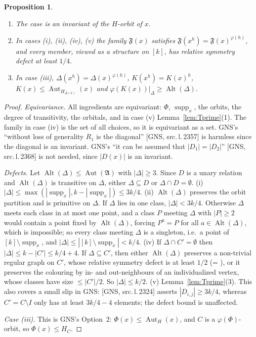 \documentclass[11pt]{article}
\theoremstyle{plain}
\newtheorem{proposition}[theorem]{Proposition}
\theoremstyle{definition}
\theoremstyle{remark}
\theoremstyle{named}
\theoremstyle{namedrm}
\newcommand{\Alt}{\operatorname{Alt}}
\newcommand{\Aut}{\operatorname{Aut}}
\newcommand{\supp}{\operatorname{supp}}
\newcommand{\fA}{\mathfrak{A}}
\newcommand{\fF}{\mathfrak{F}}
\newcommand{\src}[2]{[#1, src.\,l.\,#2]}
\begin{document}
\begin{proposition}\label{prop:cases}
\begin{enumerate}
\item The case is an invariant of the $H$-orbit of $x$.
\item In cases (i), (ii), (iv), (v) the family $\fF(x)$ satisfies $\fF(x^h)=\fF(x)^{\varphi(h)}$, and every
  member, viewed as a structure on $[k]$, has relative symmetry defect at least $1/4$.
\item In case (iii), $\Delta(x^h)=\Delta(x)^{\varphi(h)}$, $K(x^h)=K(x)^h$, $K(x)\le\Aut_{H_{\Delta(x)}}(x)$ and
  $\varphi(K(x))|_{\Delta}\ge\Alt(\Delta)$.
\end{enumerate}
\end{proposition}
\begin{proof}
\emph{Equivariance.} All ingredients are equivariant: $\Phi$, $\supp_x$, the orbits, the degree of transitivity,
the orbitals, and in case (v) Lemma~\ref{lem:Tprime}(1). The family in case (iv) is the set of all
choices, so it is equivariant as a set. GNS's ``without loss of generality $R_1$ is the diagonal''
\src{GNS}{2357} is harmless since the diagonal is an invariant. GNS's ``it can be assumed that
$|D_1|=|D_2|$'' \src{GNS}{2368} is not needed, since $|D(x)|$ is an invariant.

\emph{Defects.} Let $\Alt(\Delta)\le\Aut(\fA)$ with $|\Delta|\ge3$. Since $D$ is a unary relation and $\Alt(\Delta)$
is transitive on $\Delta$, either $\Delta\subseteq D$ or $\Delta\cap D=\emptyset$.
(i) $|\Delta|\le\max(|\supp_x|,k-|\supp_x|)\le3k/4$.
(ii) $\Alt(\Delta)$ preserves the orbit partition and is primitive on $\Delta$. If $\Delta$ lies in one class,
$|\Delta|<3k/4$. Otherwise $\Delta$ meets each class in at most one point, and a class $P$ meeting $\Delta$ with
$|P|\ge2$ would contain a point fixed by $\Alt(\Delta)$, forcing $P^a=P$ for all $a\in\Alt(\Delta)$, which is
impossible; so every class meeting $\Delta$ is a singleton, i.e.\ a point of $[k]\setminus\supp_x$, and
$|\Delta|\le|[k]\setminus\supp_x|<k/4$.
(iv) If $\Delta\cap C'=\emptyset$ then $|\Delta|\le k-|C'|\le k/4+4$. If $\Delta\subseteq C'$, then either $\Alt(\Delta)$
preserves a non-trivial regular graph on $C'$, whose relative symmetry defect is at least $1/2$
\cite[Lemma~A.3]{GNS} (= \cite[Cor.~2.4.13]{Bab15}), or it preserves the colouring by in- and
out-neighbours of an individualized vertex, whose classes have size $\le|C'|/2$. So $|\Delta|\le k/2$.
(v) Lemma~\ref{lem:Tprime}(3).
This also covers a small slip in GNS: \src{GNS}{2324} asserts $|D_{i,j}|\ge3k/4$, whereas
$C'=C\setminus I$ only has at least $3k/4-4$ elements; the defect bound is unaffected.

\emph{Case (iii).} This is GNS's Option~2: $\Phi(x)\le\Aut_H(x)$, and $C$ is a $\varphi(\Phi)$-orbit, so $\Phi(x)\le H_C$.
\end{proof}
\end{document}
